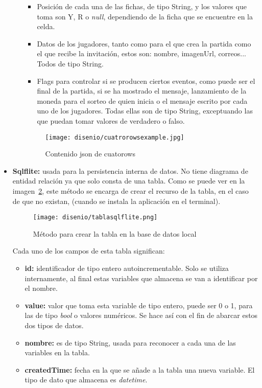 \begin{itemize}
\begin{itemize}
		\begin{itemize}
			\item Posición de cada una de las fichas, de tipo String, y los valores que toma son Y, R o \emph{null}, dependiendo de la ficha que se encuentre en la celda.
			\item Datos de los jugadores, tanto como para el que crea la partida como el que recibe la invitación, estos son: nombre, imagenUrl, correos... Todos de tipo String.
			\item Flags para controlar si se producen ciertos eventos, como puede ser el final de la partida, si se ha mostrado el mensaje, lanzamiento de la moneda para el sorteo de quien inicia o el mensaje escrito por cada uno de los jugadores. Todas ellas son de tipo String, exceptuando las que puedan tomar valores de verdadero o falso.
		\end{itemize}
	
		\begin{figure}[H]
			\centering
			\texttt{[image: disenio/cuatrorowsexample.jpg]}
			\caption{Contenido json de cuatorows}\label{fig:cuatrorowsexample}
		\end{figure}
	\end{itemize}
	
	\item \textbf{Sqlflite:} usada para la persistencia interna de datos. No tiene diagrama de entidad relación ya que solo consta de una tabla. Como se puede ver en la imagen~\ref{fig:tablasqlflite}, este método se encarga de crear el recurso de la tabla, en el caso de que no existan, (cuando se instala la aplicación en el terminal).
	
	\begin{figure}[H]
		\centering
		\texttt{[image: disenio/tablasqlflite.png]}
		\caption{Método para crear la tabla en la base de datos local}\label{fig:tablasqlflite}
	\end{figure}

	Cada uno de los campos de esta tabla significan:
	\begin{itemize}
		\item \textbf{id:} identificador de tipo entero autoincrementable. Solo se utiliza internamente, al final estas variables que almacena se van a identificar por el nombre.
		\item \textbf{value:} valor que toma esta variable de tipo entero, puede ser 0 o 1, para las de tipo \emph{bool} o valores numéricos. Se hace así con el fin de abarcar estos dos tipos de datos.
		\item \textbf{nombre:} es de tipo String, usada para reconocer a cada una de las variables en la tabla.
		\item \textbf{createdTime:} fecha en la que se añade a la tabla una nueva variable. El tipo de dato que almacena es \emph{datetime}.
	\end{itemize}


\end{itemize}
